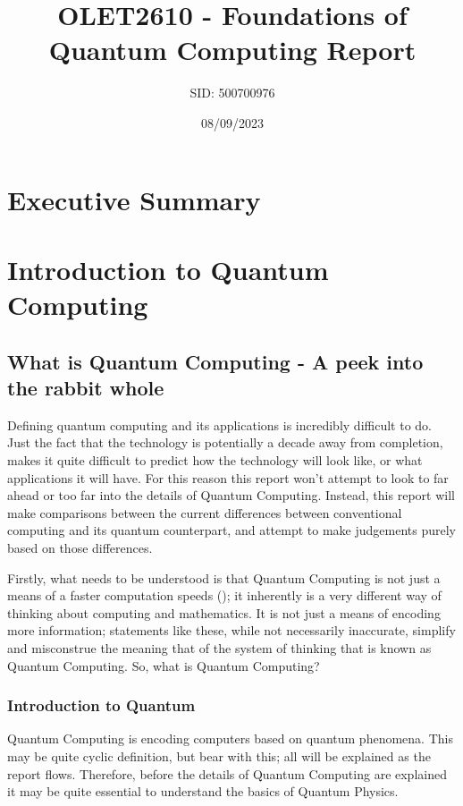 \documentclass[a4paper]{article}
\title{OLET2610 - Foundations of Quantum Computing Report}
\author{SID: 500700976}
\date{08/09/2023}
\begin{document}
\maketitle
\newpage


\section{Executive Summary}
\section{Introduction to Quantum Computing}
\subsection{What is Quantum Computing  - A peek into the rabbit whole}
Defining quantum computing and its applications is incredibly difficult to do. Just the fact that the technology is potentially a decade away from completion, makes it quite difficult to predict how the technology will look like, or what applications it will have. For this reason this report won't attempt to look to far ahead or too far into the details of Quantum Computing. Instead, this report will make comparisons between the current differences between conventional computing and its quantum counterpart, and attempt to make judgements purely based on those differences.

Firstly, what needs to be understood is that Quantum Computing is not just a means of a faster computation speeds (\cite{unknown-author-2023}); it inherently is a very different way of thinking about computing and mathematics. It is not just a means of encoding more information; statements like these, while not necessarily inaccurate, simplify and misconstrue the meaning that of the system of thinking that is known as Quantum Computing. So, what is Quantum Computing?

\subsubsection{Introduction to Quantum}
Quantum Computing is encoding computers based on quantum phenomena. This may be quite cyclic definition, but bear with this; all will be explained as the report flows. Therefore, before the details of Quantum Computing are explained it may be quite essential to understand the basics of Quantum Physics.
\end{document}
